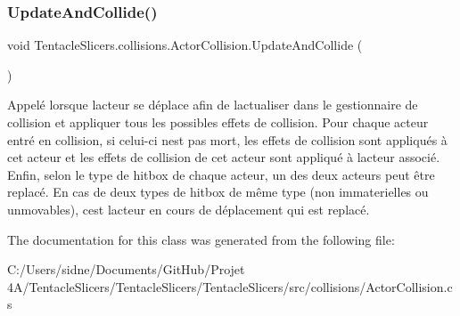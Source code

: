 \subsubsection{\texorpdfstring{Update\+And\+Collide()}{UpdateAndCollide()}}
{\footnotesize\ttfamily void Tentacle\+Slicers.\+collisions.\+Actor\+Collision.\+Update\+And\+Collide (\begin{DoxyParamCaption}{ }\end{DoxyParamCaption})}



Appelé lorsque l\textquotesingle{}acteur se déplace afin de l\textquotesingle{}actualiser dans le gestionnaire de collision et appliquer tous les possibles effets de collision. Pour chaque acteur entré en collision, si celui-\/ci n\textquotesingle{}est pas mort, les effets de collision sont appliqués à cet acteur et les effets de collision de cet acteur sont appliqué à l\textquotesingle{}acteur associé. Enfin, selon le type de hitbox de chaque acteur, un des deux acteurs peut être replacé. En cas de deux types de hitbox de même type (non immaterielles ou unmovables), c\textquotesingle{}est l\textquotesingle{}acteur en cours de déplacement qui est replacé. 



The documentation for this class was generated from the following file\+:\begin{DoxyCompactItemize}
\item 
C\+:/\+Users/sidne/\+Documents/\+Git\+Hub/\+Projet 4\+A/\+Tentacle\+Slicers/\+Tentacle\+Slicers/\+Tentacle\+Slicers/src/collisions/Actor\+Collision.\+cs\end{DoxyCompactItemize}
